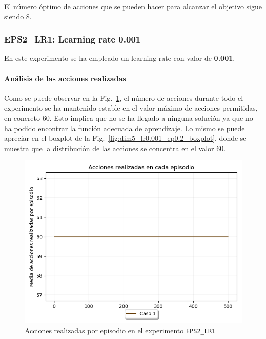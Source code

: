 El número óptimo de acciones que se pueden hacer para alcanzar el objetivo sigue siendo 8.

\subsubsection{EPS2\_LR1: Learning rate 0.001} \label{EPS2_LR1}

En este experimento se ha empleado un learning rate con valor de \textbf{0.001}. 

\paragraph{Análisis de las acciones realizadas} 

Como se puede observar en la Fig.~\ref{fig:dim5_lr0.001_ep0.2_acciones}, el número de acciones durante todo el experimento se ha mantenido estable en el valor máximo de acciones permitidas, en concreto 60. Esto implica que no se ha llegado a ninguna solución ya que no ha podido encontrar la función adecuada de aprendizaje. Lo mismo se puede apreciar en el boxplot de la Fig.~\ref{fig:dim5_lr0.001_ep0.2_boxplot}, donde se muestra que la distribución de las acciones se concentra en el valor 60. \\

\begin{figure}
    \centering
    \includegraphics[scale=0.4]{cap5_experimentacion/images/dim5_lr0.001_ep0.2_acciones.png}
    \caption{Acciones realizadas por episodio en el experimento \texttt{EPS2\_LR1}}
    \label{fig:dim5_lr0.001_ep0.2_acciones}
\end{figure}

